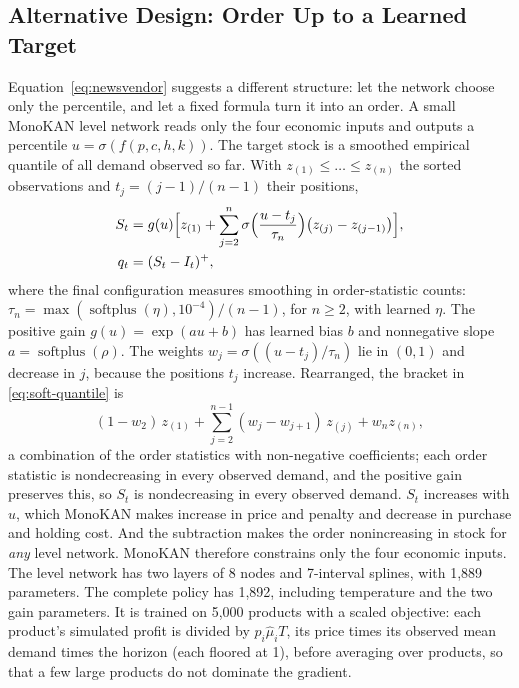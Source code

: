 \documentclass[conference]{IEEEtran}
\begin{document}
\subsection{Alternative Design: Order Up to a Learned Target}\label{sec:alternative-design}
Equation~\eqref{eq:newsvendor} suggests a different structure: let the network choose only the percentile, and let a
fixed formula turn it into an order. A small MonoKAN level network reads only the four economic inputs and outputs a
percentile $u = \sigma(f(p, c, h, k))$. The target stock is a smoothed empirical quantile of all demand observed so
far. With $z_{(1)} \leq \dots \leq z_{(n)}$ the sorted observations and $t_j = (j - 1)/(n - 1)$ their positions,
\begin{equation}
\begin{aligned}
S_t &= g(u) \Bigl[ z_{(1)} + \sum_{j=2}^{n} \sigma\Bigl(\frac{u - t_j}{\tau_n}\Bigr) \bigl(z_{(j)} - z_{(j-1)}\bigr)
\Bigr],\\
q_t &= (S_t - I_t)^+,
\end{aligned}
\label{eq:soft-quantile}
\end{equation}
where the final configuration measures smoothing in order-statistic counts:
$\tau_n=\max(\operatorname{softplus}(\eta),10^{-4})/(n-1)$, for $n\geq2$, with learned $\eta$.
The positive gain $g(u)=\exp(a u+b)$ has learned bias $b$ and nonnegative slope
$a=\operatorname{softplus}(\rho)$. The weights $w_j = \sigma((u - t_j)/\tau_n)$ lie in $(0, 1)$ and decrease in $j$, because the positions $t_j$
increase. Rearranged, the bracket in \eqref{eq:soft-quantile} is
\[
(1 - w_2)\, z_{(1)} + \sum_{j=2}^{n-1} (w_j - w_{j+1})\, z_{(j)} + w_n z_{(n)},
\]
a combination of the order statistics with non-negative coefficients; each order statistic is nondecreasing in every observed demand, and the positive gain
preserves this, so $S_t$ is nondecreasing in every observed demand. $S_t$ increases with $u$, which MonoKAN makes
increase in price and penalty and decrease in purchase and holding cost. And the subtraction makes the order
nonincreasing in stock for \emph{any} level network. MonoKAN therefore constrains only the four economic inputs.
The level network has two layers of 8 nodes and 7-interval splines, with 1,889 parameters. The complete policy has
1,892, including temperature and the two gain parameters. It is trained on 5,000 products with a scaled objective: each
product's simulated profit is divided by $p_i \hat{\mu}_i T$, its price times its observed mean demand times the
horizon (each floored at 1), before averaging over products, so that a few large products do not dominate the
gradient.
\end{document}
